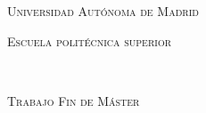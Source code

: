 \begin{titlepage}

\begin{center}

\vspace*{2cm}

\LARGE \textsc{Universidad Autónoma de Madrid}\\

\vspace{.2cm}

\large \textsc{Escuela politécnica superior}\\

\vspace{.2cm}

\begin{figure}[h]
    \begin{center}
        \begin{minipage}[c]{0.495\linewidth}
        \end{minipage}
        \begin{minipage}[c]{0.495\linewidth}
        \end{minipage}
    \end{center}
    \label{fig:Escudos}
\end{figure}

\Huge \carrera\\

\vspace{1cm}

\Huge \textsc{Trabajo Fin de Máster}\\

\vspace{1.5cm}

\Huge \MakeUppercase{\textbf{\titulo}}

\vspace{3cm}


\Large \autor\\
\Large \tutor\\
\Large \ponente\\

\vspace{0.5cm}

\Large \fecha

\end{center}

\end{titlepage}

\normalsize


\newpage \thispagestyle{empty} %
